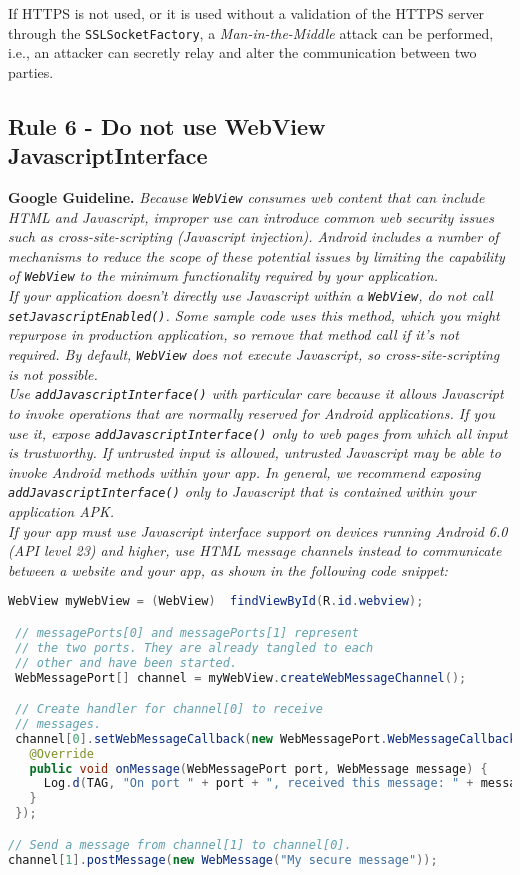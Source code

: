 If HTTPS is not used, or it is used without a validation of the HTTPS server through the \texttt{SSLSocketFactory}, a \textit{Man-in-the-Middle} attack can be performed, i.e., an attacker can secretly relay and alter the communication between two parties. 

\subsection{Rule 6 - Do not use WebView JavascriptInterface} 

\textbf{Google Guideline.} \emph{Because \texttt{WebView} consumes web content that can include HTML and Javascript, improper use can introduce common web security issues such as cross-site-scripting (Javascript injection). Android includes a number of mechanisms to reduce the scope of these potential issues by limiting the capability of \texttt{WebView} to the minimum functionality required by your application.
\\
If your application doesn't directly use Javascript within a \texttt{WebView}, do not call \texttt{setJavascriptEnabled()}. Some sample code uses this method, which you might repurpose in production application, so remove that method call if it's not required. By default, \texttt{WebView} does not execute Javascript, so cross-site-scripting is not possible.
\\
Use \texttt{addJavascriptInterface()} with particular care because it allows Javascript to invoke operations that are normally reserved for Android applications. If you use it, expose \texttt{addJavascriptInterface()} only to web pages from which all input is trustworthy. If untrusted input is allowed, untrusted Javascript may be able to invoke Android methods within your app. In general, we recommend exposing \texttt{addJavascriptInterface()} only to Javascript that is contained within your application APK.
\\
If your app must use Javascript interface support on devices running Android 6.0 (API level 23) and higher, use HTML message channels instead to communicate between a website and your app, as shown in the following code snippet:}

\begin{lstlisting}[language=Java, caption=Use HTML message channels, numbers=none]
 WebView myWebView = (WebView)  findViewById(R.id.webview);

 // messagePorts[0] and messagePorts[1] represent
 // the two ports. They are already tangled to each
 // other and have been started.
 WebMessagePort[] channel = myWebView.createWebMessageChannel();

 // Create handler for channel[0] to receive
 // messages.
 channel[0].setWebMessageCallback(new WebMessagePort.WebMessageCallback() {
   @Override
   public void onMessage(WebMessagePort port, WebMessage message) {
     Log.d(TAG, "On port " + port + ", received this message: " + message);
   }
 });

// Send a message from channel[1] to channel[0].
channel[1].postMessage(new WebMessage("My secure message"));
\end{lstlisting}

